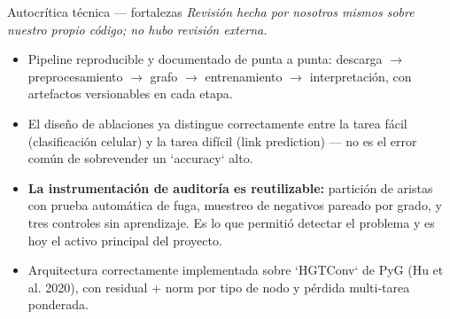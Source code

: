 \begin{frame}{Autocr\'itica t\'ecnica --- fortalezas}
  \scriptsize\textit{Revisi\'on hecha por nosotros mismos sobre nuestro propio c\'odigo;
  no hubo revisi\'on externa.}

  \small
  \begin{itemize}
    \item Pipeline reproducible y documentado de punta a punta: descarga $\to$ preprocesamiento $\to$ grafo $\to$ entrenamiento $\to$ interpretaci\'on, con artefactos versionables en cada etapa.
    \item El dise\~no de ablaciones ya distingue correctamente entre la tarea f\'acil (clasificaci\'on celular) y la tarea dif\'icil (link prediction) --- no es el error com\'un de sobrevender un `accuracy` alto.
    \item \textbf{La instrumentaci\'on de auditor\'ia es reutilizable:} partici\'on de
          aristas con prueba autom\'atica de fuga, muestreo de negativos pareado por
          grado, y tres controles sin aprendizaje. Es lo que permiti\'o detectar el
          problema y es hoy el activo principal del proyecto.
    \item Arquitectura correctamente implementada sobre `HGTConv` de PyG (Hu et al. 2020), con residual + norm por tipo de nodo y p\'erdida multi-tarea ponderada.
  \end{itemize}
\end{frame}

